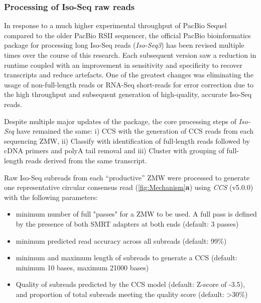 \subsubsection{Processing of Iso-Seq raw reads}
\label{section: Isoseq_rawprocessing}
In response to a much higher experimental throughput of PacBio Sequel compared to the older PacBio RSII sequencer, the official PacBio bioinformatics package for processing long Iso-Seq reads (\textit{Iso-Seq3}) has been revised multiple times over the course of this research. Each subsequent version saw a reduction in runtime coupled with an improvement in sensitivity and specificity to recover transcripts and reduce artefacts. One of the greatest changes was eliminating the usage of non-full-length reads or RNA-Seq short-reads for error correction due to the high throughput and subsequent generation of high-quality, accurate Iso-Seq reads. 

Despite multiple major updates of the package, the core processing steps of \textit{Iso-Seq} have remained the same: i) CCS with the generation of CCS reads from each sequencing ZMW, ii) Classify with identification of full-length reads followed by cDNA primers and polyA tail removal and iii) Cluster with grouping of full-length reads derived from the same transcript. 

Raw Iso-Seq subreads from each “productive” ZMW were processed to generate one representative circular consensus read (\cref{fig:Mechanism}\textbf{a}) using \textit{CCS} (v5.0.0) with the following parameters: 
\begin{itemize}
	\item minimum number of full "passes" for a ZMW to be used. A full pass is defined by the presence of both SMRT adapters at both ends (default: 3 passes)
	\item minimum predicted read accuracy across all subreads (default: 99\%)
	\item minimum and maximum length of subreads to generate a CCS (default: minimum 10 bases, maximum 21000 bases)
	\item Quality of subreads predicted by the CCS model (default: Z-score of -3.5), and proportion of total subreads meeting the quality score (default: \textgreater 30\%)
\end{itemize}


